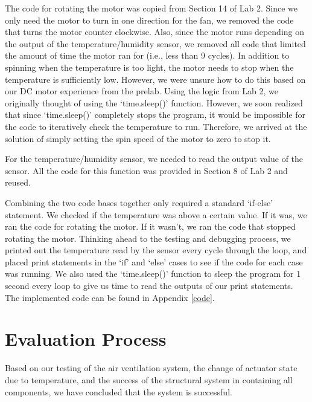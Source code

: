 \documentclass[11pt]{article}
\begin{document}
The code for rotating the motor was copied from Section 14 of Lab 2. Since we only need the motor to turn in one direction for the fan, we removed the code that turns the motor counter clockwise. Also, since the motor runs depending on the output of the temperature/humidity sensor, we removed all code that limited the amount of time the motor ran for (i.e., less than 9 cycles). In addition to spinning when the temperature is too light, the motor needs to stop when the temperature is sufficiently low. However, we were unsure how to do this based on our DC motor experience from the prelab. Using the logic from Lab 2, we originally thought of using the ‘time.sleep()’ function. However, we soon realized that since ‘time.sleep()’ completely stops the program, it would be impossible for the code to iteratively check the temperature to run. Therefore, we arrived at the solution of simply setting the spin speed of the motor to zero to stop it. 

For the temperature/humidity sensor, we needed to read the output value of the sensor. All the code for this function was provided in Section 8 of Lab 2 and reused. 

Combining the two code bases together only required a standard ‘if-else’ statement. We checked if the temperature was above a certain value. If it was, we ran the code for rotating the motor. If it wasn’t, we ran the code that stopped rotating the motor. Thinking ahead to the testing and debugging process, we printed out the temperature read by the sensor every cycle through the loop, and placed print statements in the ‘if’ and ‘else’ cases to see if the code for each case was running. We also used the ‘time.sleep()’ function to sleep the program for 1 second every loop to give us time to read the outputs of our print statements. The implemented code can be found in Appendix \ref{code}.






\section{Evaluation Process}
Based on our testing of the air ventilation system, the change of actuator state due to temperature, and the success of the structural system in containing all components, we have concluded that the system is successful.
\end{document}
